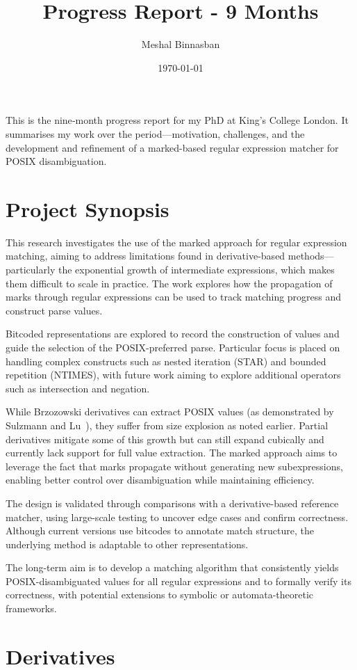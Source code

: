 \documentclass[12pt]{article}
\title{Progress Report - 9 Months}
\author{Meshal Binnasban}
\date{\today}
\begin{document}
\maketitle
This is the nine‑month progress report for my PhD at King's College London. It summarises my work over
the period—motivation, challenges, and the development and refinement of a marked-based regular expression
matcher for POSIX disambiguation.
\section*{Project Synopsis}
This research investigates the use of the marked approach for regular expression matching, aiming to address 
limitations found in derivative-based methods—particularly the exponential growth of intermediate expressions,
which makes them difficult to scale in practice. The work explores how the propagation of marks through regular
expressions can be used to track matching progress and construct parse values.

Bitcoded representations are explored to record the construction of values and guide the selection of the 
POSIX-preferred parse. Particular focus is placed on handling complex constructs such as nested iteration (STAR) 
and bounded repetition (NTIMES), with future work aiming to explore additional operators such as intersection and
negation.

While Brzozowski derivatives can extract POSIX values (as demonstrated by Sulzmann and Lu~\cite{Sulzmann2014}), 
they suffer from size explosion as noted earlier. Partial derivatives mitigate some of this growth but can still 
expand cubically and currently lack support for full value extraction. The marked approach aims to leverage the 
fact that marks propagate without generating new subexpressions, enabling better control over disambiguation while
maintaining efficiency.

The design is validated through comparisons with a derivative-based reference matcher, using large-scale testing 
to uncover edge cases and confirm correctness. Although current versions use bitcodes to annotate match structure,
the underlying method is adaptable to other representations.

The long-term aim is to develop a matching algorithm that consistently yields POSIX-disambiguated values for all 
regular expressions and to formally verify its correctness, with potential extensions to symbolic or automata-theoretic 
frameworks.

\newpage
\section{Derivatives}
\end{document}
